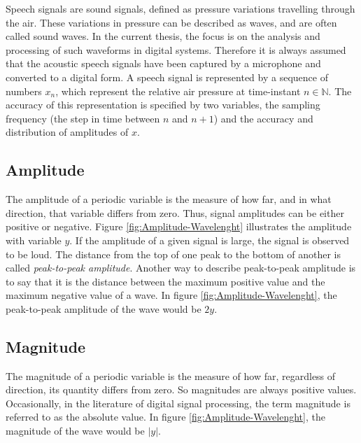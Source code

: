 Speech signals are sound signals, defined as pressure variations travelling through the air. These variations in pressure can be described as waves, and are often called sound waves. In the current thesis, the focus is on the analysis and processing of such waveforms in digital systems. Therefore it is always assumed that the acoustic speech signals have been captured by a microphone and converted to a digital form.
\newline
\newline
A speech signal is represented by a sequence of numbers $x_n$, which represent the relative air pressure at time-instant $n\in{\mathbb N}$. The accuracy of this representation is specified by two variables, the sampling frequency (the step in time between $n$ and $n+1$) and the accuracy and distribution of amplitudes of $x$.

\subsection{Amplitude}
\label{sub:Amplitude}

The amplitude of a periodic variable is the measure of how far, and in what direction, that variable differs from zero. Thus, signal amplitudes can be either positive or negative. Figure \ref{fig:Amplitude-Wavelenght} illustrates the amplitude with variable $y$. If the amplitude of a given signal is large, the signal is observed to be loud.
\newline
\newline
The distance from the top of one peak to the bottom of another is called \textit{peak-to-peak amplitude}. Another way to describe peak-to-peak amplitude is to say that it is the distance between the maximum positive value and the maximum negative value of a wave. In figure \ref{fig:Amplitude-Wavelenght}, the peak-to-peak amplitude of the wave would be $2y$.

\subsection{Magnitude}
\label{sub:Magnitude}

The magnitude of a periodic variable is the measure of how far, regardless of direction, its quantity differs from zero. So magnitudes are always positive values. Occasionally, in the literature of digital signal processing, the term magnitude is referred to as the absolute value. In figure \ref{fig:Amplitude-Wavelenght}, the magnitude of the wave would be $|y|$.

